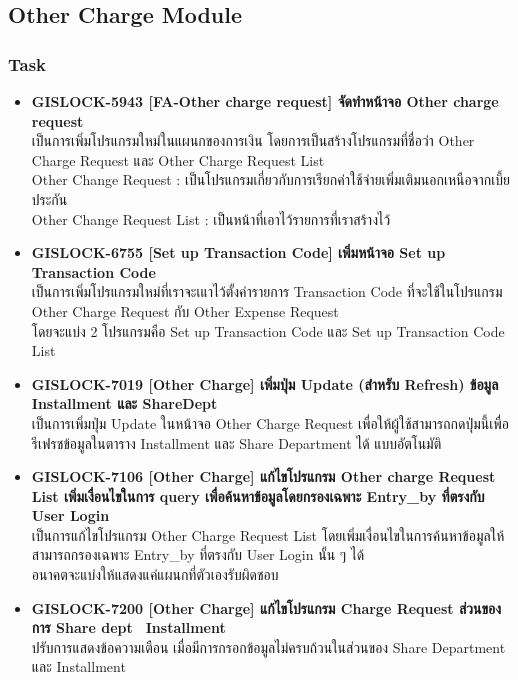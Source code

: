 \subsection{Other Charge Module}

\subsubsection{Task}
\begin{itemize}
    \setlength\itemsep{1em}
    \item \textbf{{GISLOCK-5943 [FA-Other charge request] จัดทำหน้าจอ Other charge request}} \\
          เป็นการเพิ่มโปรแกรมใหม่ในแผนกของการเงิน โดยการเป็นสร้างโปรแกรมที่ชื่อว่า Other Charge Request และ Other Charge Request List\\
          Other Change Request : เป็นโปรแกรมเกี่ยวกับการเรียกค่าใช้จ่ายเพิ่มเติมนอกเหนือจากเบี้ยประกัน \\
          Other Change Request List : เป็นหน้าที่เอาไว้รายการที่เราสร้างไว้
    \item \textbf{{GISLOCK-6755 [Set up Transaction Code] เพิ่มหน้าจอ Set up Transaction Code}} \\
          เป็นการเพิ่มโปรแกรมใหม่ที่เราจะเแาไว้ตั้งค่ารายการ Transaction Code ที่จะใช้ในโปรแกรม Other Charge Request กับ Other Expense Request \\
          โดยจะแบ่ง 2 โปรแกรมคือ Set up Transaction Code และ Set up Transaction Code List 
    \item \textbf{{GISLOCK-7019 [Other Charge] เพิ่มปุ่ม Update (สำหรับ Refresh) ข้อมูล Installment และ ShareDept}} \\
          เป็นการเพิ่มปุ่ม Update ในหน้าจอ Other Charge Request เพื่อให้ผู้ใช้สามารถกดปุ่มนี้เพื่อรีเฟรชข้อมูลในตาราง Installment และ Share Department ได้ แบบอัตโนมัติ
    \item \textbf{{GISLOCK-7106 [Other Charge] แก้ไขโปรแกรม Other charge Request List เพิ่มเงื่อนไขในการ query เพื่อค้นหาข้อมูลโดยกรองเฉพาะ Entry\_by ที่ตรงกับ User Login}} \\
          เป็นการแก้ไขโปรแกรม Other Charge Request List โดยเพิ่มเงื่อนไขในการค้นหาข้อมูลให้สามารถกรองเฉพาะ Entry\_by ที่ตรงกับ User Login นั้น ๆ ได้ \\
          อนาคตจะแบ่งให้แสดงแค่แผนกที่ตัวเองรับผิดชอบ
    \item \textbf{{GISLOCK-7200 [Other Charge] แก้ไขโปรแกรม Charge Request ส่วนของการ Share dept \, Installment}} \\
          ปรับการแสดงข้อความเตือน เมื่อมีการกรอกข้อมูลไม่ครบถ้วนในส่วนของ Share Department และ Installment \\

\end{itemize}
